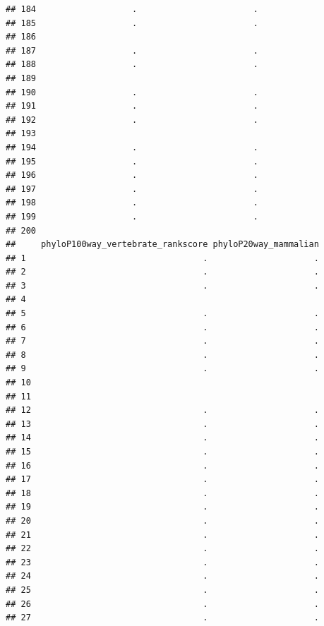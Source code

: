 \documentclass[
]{article}
\begin{document}
\begin{verbatim}
## 184                   .                       .
## 185                   .                       .
## 186                                            
## 187                   .                       .
## 188                   .                       .
## 189                                            
## 190                   .                       .
## 191                   .                       .
## 192                   .                       .
## 193                                            
## 194                   .                       .
## 195                   .                       .
## 196                   .                       .
## 197                   .                       .
## 198                   .                       .
## 199                   .                       .
## 200                                            
##     phyloP100way_vertebrate_rankscore phyloP20way_mammalian
## 1                                   .                     .
## 2                                   .                     .
## 3                                   .                     .
## 4                                                          
## 5                                   .                     .
## 6                                   .                     .
## 7                                   .                     .
## 8                                   .                     .
## 9                                   .                     .
## 10                                                         
## 11                                                         
## 12                                  .                     .
## 13                                  .                     .
## 14                                  .                     .
## 15                                  .                     .
## 16                                  .                     .
## 17                                  .                     .
## 18                                  .                     .
## 19                                  .                     .
## 20                                  .                     .
## 21                                  .                     .
## 22                                  .                     .
## 23                                  .                     .
## 24                                  .                     .
## 25                                  .                     .
## 26                                  .                     .
## 27                                  .                     .

\end{verbatim}
\end{document}
